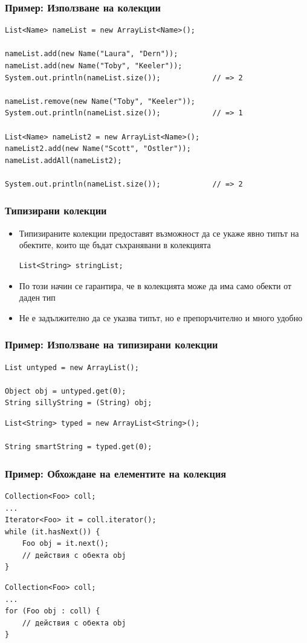 \documentclass[ignorenonframetext, hyperref=unicode,compress]{beamer}
\begin{document}
\begin{frame}[containsverbatim]\frametitle{Пример: Използване на колекции}
\begin{lstlisting}
List<Name> nameList = new ArrayList<Name>();

nameList.add(new Name("Laura", "Dern"));
nameList.add(new Name("Toby", "Keeler"));
System.out.println(nameList.size()); 			// => 2

nameList.remove(new Name("Toby", "Keeler"));
System.out.println(nameList.size()); 			// => 1

List<Name> nameList2 = new ArrayList<Name>();
nameList2.add(new Name("Scott", "Ostler"));
nameList.addAll(nameList2);

System.out.println(nameList.size()); 			// => 2
\end{lstlisting}
\end{frame}

\begin{frame}[containsverbatim]\frametitle{Типизирани колекции}
\begin{itemize}
 \item Типизираните колекции предоставят възможност да се укаже явно типът на обектите, които ще бъдат съхранявани в колекцията
\begin{lstlisting}
List<String> stringList;
\end{lstlisting}
 \item По този начин се гарантира, че в колекцията може да има само обекти от даден тип
 \item Не е задължително да се указва типът, но е препоръчително и много удобно
\end{itemize}
\end{frame}

\begin{frame}[containsverbatim]\frametitle{Пример: Използване на типизирани колекции}
\begin{lstlisting}
List untyped = new ArrayList();

Object obj = untyped.get(0);
String sillyString = (String) obj;
\end{lstlisting}
\begin{lstlisting}
List<String> typed = new ArrayList<String>();

String smartString = typed.get(0);
\end{lstlisting}
\end{frame}

\begin{frame}[containsverbatim]\frametitle{Пример: Обхождане на елементите на колекция}
\begin{lstlisting}
Collection<Foo> coll;
...
Iterator<Foo> it = coll.iterator();
while (it.hasNext()) {
	Foo obj = it.next();
	// действия с обекта obj
}
\end{lstlisting}
\begin{lstlisting}
Collection<Foo> coll;
...
for (Foo obj : coll) {
	// действия с обекта obj
}
\end{lstlisting}
\end{frame}
\end{document}
